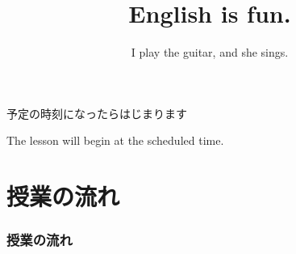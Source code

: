 \documentclass[aspectratio=169,xcolor={dvipsnames,table}]{beamer}
\title{English is fun.}
\subtitle{I play the guitar, and she sings.}
\author{}
\institute[]{}
\date[]
\begin{document}
\begin{frame}[label=waiting]{}
\thispagestyle{empty}
\Large
\raggedright

予定の時刻になったらはじまります

\vfill

\raggedleft

The lesson will begin at the scheduled time.
\end{frame}
\begin{frame}[label=title]
\thispagestyle{empty}
\titlepage
\end{frame}
\section*{授業の流れ}
\begin{frame}[plain]
  \frametitle{授業の流れ}
  \tableofcontents
\end{frame}
\end{document}
